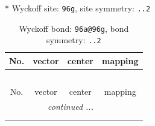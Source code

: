 \documentclass[fleqn,8pt]{jsarticle}
\begin{document}
* Wyckoff site: {\tt 96g}, site symmetry: {\tt ..2}
\renewcommand{\arraystretch}{1.2}
\begin{longtable}{cccc}
\caption{Wyckoff bond: {\tt 96a@96g}, bond symmetry: {\tt ..2}}
 \\
 \hline \hline
No. & vector & center & mapping \\ \hline \endfirsthead

\multicolumn{3}{l}{\tablename\ \thetable{}} \\
 \hline \hline
No. & vector & center & mapping \\ \hline \endhead

 \hline \hline
\multicolumn{3}{r}{\footnotesize\it continued ...} \\ \endfoot

 \hline \hline
\multicolumn{3}{r}{} \\ \endlastfoot


\end{longtable}
\end{document}
